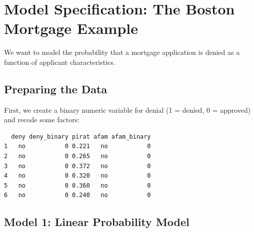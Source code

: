\documentclass[
  12pt,
  a4paper,
]{scrbook}
\newenvironment{Shaded}{\begin{snugshade}}{\end{snugshade}}
\newcommand{\CommentTok}[1]{\textcolor[rgb]{0.37,0.37,0.37}{#1}}
\newcommand{\DecValTok}[1]{\textcolor[rgb]{0.68,0.00,0.00}{#1}}
\newcommand{\FunctionTok}[1]{\textcolor[rgb]{0.28,0.35,0.67}{#1}}
\newcommand{\NormalTok}[1]{\textcolor[rgb]{0.00,0.23,0.31}{#1}}
\newcommand{\OtherTok}[1]{\textcolor[rgb]{0.00,0.23,0.31}{#1}}
\newcommand{\SpecialCharTok}[1]{\textcolor[rgb]{0.37,0.37,0.37}{#1}}
\newcommand{\StringTok}[1]{\textcolor[rgb]{0.13,0.47,0.30}{#1}}
\theoremstyle{plain}
\theoremstyle{definition}
\theoremstyle{remark}
\begin{document}
\section{Model Specification: The Boston Mortgage
Example}\label{model-specification-the-boston-mortgage-example}

We want to model the probability that a mortgage application is denied
as a function of applicant characteristics.

\subsection{Preparing the Data}\label{preparing-the-data}

First, we create a binary numeric variable for denial (1 = denied, 0 =
approved) and recode some factors:

\begin{Shaded}
\end{Shaded}

\begin{verbatim}
  deny deny_binary pirat afam afam_binary
1   no           0 0.221   no           0
2   no           0 0.265   no           0
3   no           0 0.372   no           0
4   no           0 0.320   no           0
5   no           0 0.360   no           0
6   no           0 0.240   no           0
\end{verbatim}

\subsection{Model 1: Linear Probability
Model}\label{model-1-linear-probability-model}
\end{document}
